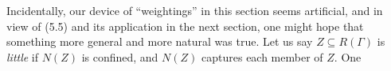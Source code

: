 Incidentally, our device of ``weightings'' in this section seems artificial, and in view of (5.5) and its application in the next section, one might hope that something more general and more natural was true. Let us say $Z \subseteq R(\Gamma)$ is \textit{little} if $N(Z)$ is confined, and $N(Z)$ captures each member of $Z$. One
